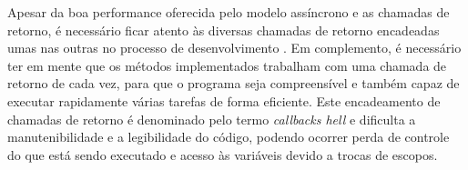   
  

 

  
  Apesar da boa performance oferecida pelo modelo assíncrono e as chamadas de retorno, é necessário ficar
  atento às diversas chamadas de retorno encadeadas umas nas outras no processo de desenvolvimento \cite{Pereira:2013}. 
  Em complemento, é necessário ter em mente que os métodos implementados trabalham com uma 
  chamada de retorno de cada vez, para que o programa seja compreensível e também capaz de executar rapidamente várias 
  tarefas de forma eficiente\cite{Hughes:2012}. Este encadeamento de chamadas de retorno é denominado pelo termo \textit{callbacks hell} 
  e dificulta a manutenibilidade e a legibilidade do código, podendo ocorrer perda de controle do que está sendo executado e acesso às 
  variáveis devido a trocas de escopos. \cite{Pereira:2013}
  
